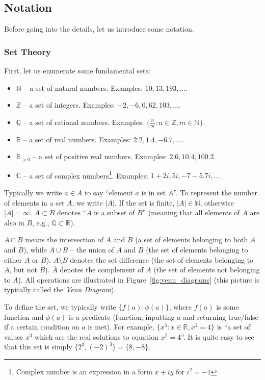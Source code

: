 \documentclass[../lecture-notes.tex]{subfiles}
\begin{document}
\subsection{Notation}

Before going into the details, let us introduce some notation.

\subsubsection{Set Theory}
First, let us enumerate some fundamental sets:
\begin{itemize}
    \item $\mathbb{N}$ -- a set of natural numbers. Examples: $10, 13, 193, \dots$.
    \item $\mathbb{Z}$ -- a set of integers. Examples: $-2, -6, 0, 62, 103, \dots$.
    \item $\mathbb{Q}$ -- a set of rational numbers. Examples: $\{\frac{n}{m}: n \in \mathbb{Z}, m \in \mathbb{N}\}$.
    \item $\mathbb{R}$ -- a set of real numbers. Examples: $2.2, 1.4, -6.7, \dots$.
    \item $\mathbb{R}_{>0}$ -- a set of positive real numbers. Examples: $2.6, 10.4, 100.2$.
    \item $\mathbb{C}$ -- a set of complex numbers\footnote{Complex number is an expression in a form $x+iy$ for $i^2=-1$}. Examples: $1+2i, 5i, -7-5.7i, \dots$.
\end{itemize}

Typically we write $a \in A$ to say ``element $a$ is in set $A$''. To represent the number of elements in a set $A$, we write $|A|$. If the set is finite, $|A| \in \mathbb{N}$, otherwise 
$|A| = \infty$. $A \subset B$ denotes ``$A$ is a subset of $B$'' (meaning that all elements of $A$ are also in $B$, e.g., $\mathbb{Q} \subset \mathbb{R}$).

$A \cap B$ means the intersection of $A$ and $B$ (a set of elements belonging to both $A$ and $B$), while $A \cup B$ -- the union of $A$ and $B$ (the set of elements belonging to either $A$ or $B$). $A \setminus B$ denotes the set difference (the set of elements belonging to $A$, but not $B$). $\overline{A}$ denotes the complement of $A$ (the set of elements not belonging to $A$). All operations are illustrated in Figure~\ref{fig:venn_diagrams} (this picture is typically called the \textit{Venn Diagram}).

To define the set, we typically write $\{f(a): \phi(a)\}$, where $f(a)$ is some function and $\phi(a)$ is a predicate (function, inputting $a$ and returning true/false if a certain condition on $a$ is met). For example, $\{x^3: x \in \mathbb{R}, x^2 = 4\}$ is ``a set of values $x^3$ which are the real solutions to equation $x^2 = 4$''. It is quite easy to see that this set is simply $\{2^3, (-2)^3\} = \{8,-8\}$. 
\end{document}
